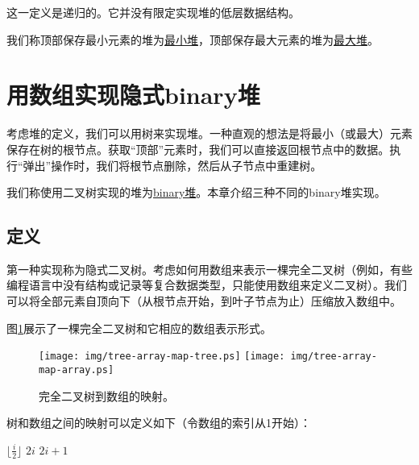 \documentclass[UTF8]{article}
\begin{document}
这一定义是递归的。它并没有限定实现堆的低层数据结构。

我们称顶部保存最小元素的堆为\underline{最小堆}，顶部保存最大元素的堆为\underline{最大堆}。

\section{用数组实现隐式binary堆}
\label{ibheap}

考虑堆的定义，我们可以用树来实现堆。一种直观的想法是将最小（或最大）元素保存在树的根节点。获取“顶部”元素时，我们可以直接返回根节点中的数据。执行“弹出”操作时，我们将根节点删除，然后从子节点中重建树。

我们称使用二叉树实现的堆为\underline{binary堆}。本章介绍三种不同的binary堆实现。

\subsection{定义}

第一种实现称为隐式二叉树。考虑如何用数组来表示一棵完全二叉树（例如，有些编程语言中没有结构或记录等复合数据类型，只能使用数组来定义二叉树）。我们可以将全部元素自顶向下（从根节点开始，到叶子节点为止）压缩放入数组中。

图\ref{fig:tree-array-map}展示了一棵完全二叉树和它相应的数组表示形式。

\begin{figure}[htbp]
       \begin{center}
       	  \texttt{[image: img/tree-array-map-tree.ps]}
          \texttt{[image: img/tree-array-map-array.ps]}
        \caption{完全二叉树到数组的映射。} \label{fig:tree-array-map}
       \end{center}
\end{figure}

树和数组之间的映射可以定义如下（令数组的索引从1开始）：

\begin{algorithmic}[1]
  \State \Return $\lfloor \frac{i}{2} \rfloor$
\EndFunction
\Statex
{}
  \State \Return $2i$
\EndFunction
\Statex
{}
  \State \Return $2i+1$
\EndFunction
\end{algorithmic}
\end{document}
